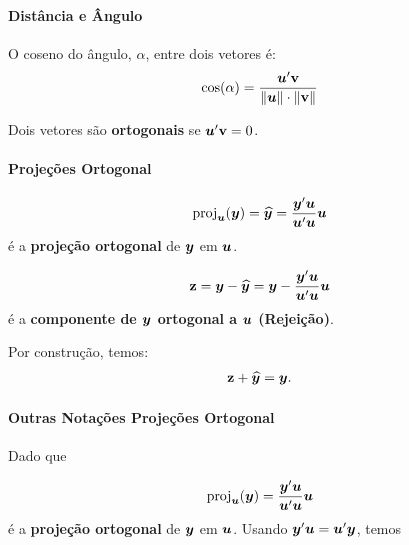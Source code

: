\documentclass[11pt, oneside, a4paper, article]{article}
\numberwithin{equation}{section}
\begin{document}
\begin{description}
\paragraph{Distância e Ângulo}

O coseno do ângulo, $\alpha$, entre dois vetores é:
\begin{align*}
	\cos(\alpha) = \frac{\boldsymbol{u}'\mathbf{v}}{\|\boldsymbol{u} \|\cdot\|\mathbf{v} \|}
\end{align*}

Dois vetores são \textbf{ortogonais} se $\boldsymbol{u}'\mathbf{v} = 0$.

\paragraph{Projeções Ortogonal}

\vspace{-1 em}
\begin{align*}
	\text{proj}_{\boldsymbol{u}}(\boldsymbol{y}) =
	\widehat{\boldsymbol{y}} =
	\frac{\boldsymbol{y}' \boldsymbol{u}}{\boldsymbol{u}'\boldsymbol{u}} \boldsymbol{u}
\end{align*}
é a \textbf{projeção ortogonal} de $\boldsymbol{y}$ em $\boldsymbol{u}$.

\vspace{-1 em}
\begin{align*}
	\mathbf{z} = \boldsymbol{y} - \widehat{\boldsymbol{y}} = \boldsymbol{y} - \frac{\boldsymbol{y}' \boldsymbol{u}}{\boldsymbol{u}'\boldsymbol{u}} \boldsymbol{u}
\end{align*}
é a \textbf{componente de $\boldsymbol{y}$ ortogonal a $\boldsymbol{u}$} \textbf{(Rejeição)}.

Por construção, temos:
\vspace{-1 em}
\begin{align*}
	\mathbf{z} + \widehat{\boldsymbol{y}} = \boldsymbol{y}.
\end{align*}


\paragraph{Outras Notações Projeções Ortogonal}
Dado que

\vspace{-1 em}
\begin{align*}
	\text{proj}_{\boldsymbol{u}}(\boldsymbol{y}) =
	\frac{\boldsymbol{y}' \boldsymbol{u}}{\boldsymbol{u}'\boldsymbol{u}} \boldsymbol{u}
\end{align*}
é a \textbf{projeção ortogonal} de $\boldsymbol{y}$ em $\boldsymbol{u}$.
Usando $\boldsymbol{y}'\boldsymbol{u} = \boldsymbol{u}'\boldsymbol{y}$, temos


\end{description}
\end{document}
